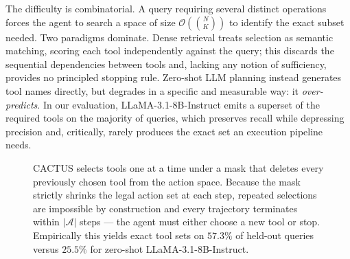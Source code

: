 \documentclass[11pt]{article}
\begin{document}
The difficulty is combinatorial. A query requiring several distinct operations forces the agent to search a space of size $\mathcal{O}(\binom{N}{K})$ to identify the exact subset needed. Two paradigms dominate. Dense retrieval treats selection as semantic matching, scoring each tool independently against the query; this discards the sequential dependencies between tools and, lacking any notion of sufficiency, provides no principled stopping rule. Zero-shot LLM planning \cite{yao2022react} instead generates tool names directly, but degrades in a specific and measurable way: it \emph{over-predicts}. In our evaluation, LLaMA-3.1-8B-Instruct \cite{dubey2024llama3} emits a superset of the required tools on the majority of queries, which preserves recall while depressing precision and, critically, rarely produces the exact set an execution pipeline needs.

\begin{figure}[t]
\centering
{}
\caption{CACTUS selects tools one at a time under a mask that deletes every previously chosen tool from the action space. Because the mask strictly shrinks the legal action set at each step, repeated selections are impossible by construction and every trajectory terminates within $|\mathcal{A}|$ steps --- the agent must either choose a new tool or stop. Empirically this yields exact tool sets on $57.3\%$ of held-out queries versus $25.5\%$ for zero-shot LLaMA-3.1-8B-Instruct.}
\label{fig:architecture}
\end{figure}
\end{document}
